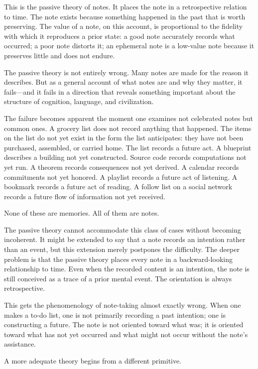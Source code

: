 \documentclass[12pt, a4paper]{article}
\theoremstyle{plain}
\theoremstyle{definition}
\theoremstyle{remark}
\begin{document}
This is the passive theory of notes. It places the note in a retrospective
relation to time. The note exists because something happened in the past that is
worth preserving. The value of a note, on this account, is proportional to the
fidelity with which it reproduces a prior state: a good note accurately records
what occurred; a poor note distorts it; an ephemeral note is a low-value note
because it preserves little and does not endure.

The passive theory is not entirely wrong. Many notes are made for the reason it
describes. But as a general account of what notes are and why they matter, it
fails---and it fails in a direction that reveals something important about the
structure of cognition, language, and civilization.

The failure becomes apparent the moment one examines not celebrated notes but
common ones. A grocery list does not record anything that happened. The items on
the list do not yet exist in the form the list anticipates: they have not been
purchased, assembled, or carried home. The list records a future act. A blueprint
describes a building not yet constructed. Source code records computations not yet
run. A theorem records consequences not yet derived. A calendar records
commitments not yet honored. A playlist records a future act of listening. A
bookmark records a future act of reading. A follow list on a social network records
a future flow of information not yet received.

None of these are memories. All of them are notes.

The passive theory cannot accommodate this class of cases without becoming
incoherent. It might be extended to say that a note records an intention rather
than an event, but this extension merely postpones the difficulty. The deeper
problem is that the passive theory places every note in a backward-looking
relationship to time. Even when the recorded content is an intention, the note is
still conceived as a trace of a prior mental event. The orientation is always
retrospective.

This gets the phenomenology of note-taking almost exactly wrong. When one makes a
to-do list, one is not primarily recording a past intention; one is constructing a
future. The note is not oriented toward what was; it is oriented toward what has
not yet occurred and what might not occur without the note's assistance.

A more adequate theory begins from a different primitive.
\end{document}
